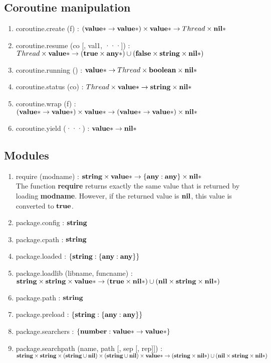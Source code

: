 \subsection{Coroutine manipulation}

\begin{enumerate}
\item coroutine.create (f) :
$(\mathbf{value}{*} \rightarrow \mathbf{value}{*}) \times \mathbf{value}{*} \rightarrow Thread \times \mathbf{nil}{*}$
\item coroutine.resume (co [, val1, ···]) :
$Thread \times
\mathbf{value}{*} \rightarrow
(\mathbf{true} \times \mathbf{any}{*}) \cup
(\mathbf{false} \times \mathbf{string} \times \mathbf{nil}{*})$
\item coroutine.running () :
$\mathbf{value}{*} \rightarrow Thread \times \mathbf{boolean} \times \mathbf{nil}{*}$
\item coroutine.status (co) :
$Thread \times \mathbf{value}{*} \rightarrow \mathbf{string} \times \mathbf{nil}{*}$
\item coroutine.wrap (f) :
$(\mathbf{value}{*} \rightarrow \mathbf{value}{*}) \times
\mathbf{value}{*} \rightarrow
(\mathbf{value}{*} \rightarrow \mathbf{value}{*}) \times
\mathbf{nil}{*}$ 
\item coroutine.yield (···) :
$\mathbf{value}{*} \rightarrow \mathbf{nil}{*}$
\end{enumerate}

\subsection{Modules}

\begin{enumerate}
\item require (modname) :
$\mathbf{string} \times \mathbf{value}{*} \rightarrow \{\mathbf{any}:\mathbf{any}\} \times \mathbf{nil}{*}$
\\
The function \textbf{require} returns exactly the same value that is
returned by loading \textbf{modname}.
However, if the returned value is $\mathbf{nil}$, this value is
converted to $\mathbf{true}$.
\item package.config : $\mathbf{string}$
\item package.cpath : $\mathbf{string}$
\item package.loaded : $\{\mathbf{string}:\{\mathbf{any}:\mathbf{any}\}\}$
\item package.loadlib (libname, funcname) :
$\mathbf{string} \times
\mathbf{string} \times
\mathbf{value}{*} \rightarrow
(\mathbf{true} \times \mathbf{nil}{*}) \cup
(\mathbf{nil} \times \mathbf{string} \times \mathbf{nil}{*})$
\item package.path : $\mathbf{string}$
\item package.preload : $\{\mathbf{string}:\{\mathbf{any}:\mathbf{any}\}\}$
\item package.searchers : $\{\mathbf{number}:\mathbf{value}{*} \rightarrow \mathbf{value}{*}\}$
\item package.searchpath (name, path [, sep [, rep]]) :
$\mathbf{string} \times
\mathbf{string} \times
(\mathbf{string} \cup \mathbf{nil}) \times
(\mathbf{string} \cup \mathbf{nil}) \times
\mathbf{value}{*} \rightarrow
(\mathbf{string} \times \mathbf{nil}{*}) \cup
(\mathbf{nil} \times \mathbf{string} \times \mathbf{nil}{*})$
\end{enumerate}

